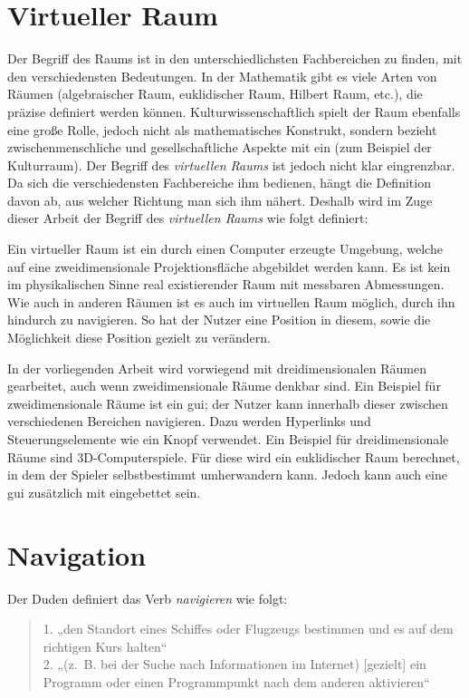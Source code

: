 \section{Virtueller Raum}
Der Begriff des Raums ist in den unterschiedlichsten Fachbereichen zu finden, mit den verschiedensten Bedeutungen.
In der Mathematik gibt es viele Arten von Räumen (algebraischer Raum, euklidischer Raum, Hilbert Raum, etc.), die präzise definiert werden können.
Kulturwissenschaftlich spielt der Raum ebenfalls eine große Rolle, jedoch nicht als mathematisches Konstrukt, sondern bezieht zwischenmenschliche und gesellschaftliche Aspekte mit ein (zum Beispiel der Kulturraum).
Der Begriff des \textit{virtuellen Raums} ist jedoch nicht klar eingrenzbar.
Da sich die verschiedensten Fachbereiche ihm bedienen, hängt die Definition davon ab, aus welcher Richtung man sich ihm nähert.
Deshalb wird im Zuge dieser Arbeit der Begriff des \textit{virtuellen Raums} wie folgt definiert:

Ein virtueller Raum ist ein durch einen Computer erzeugte Umgebung, welche auf eine zweidimensionale Projektionsfläche abgebildet werden kann.
Es ist kein im physikalischen Sinne real existierender Raum mit messbaren Abmessungen.
Wie auch in anderen Räumen ist es auch im virtuellen Raum möglich, durch ihn hindurch zu navigieren.
So hat der Nutzer eine Position in diesem, sowie die Möglichkeit diese Position gezielt zu verändern.

In der vorliegenden Arbeit wird vorwiegend mit dreidimensionalen Räumen gearbeitet, auch wenn zweidimensionale Räume denkbar sind.
Ein Beispiel für zweidimensionale Räume ist ein \ac{gui}; der Nutzer kann innerhalb dieser zwischen verschiedenen Bereichen navigieren.
Dazu werden Hyperlinks und Steuerungselemente wie ein Knopf verwendet.
Ein Beispiel für dreidimensionale Räume sind 3D-Computerspiele.
Für diese wird ein euklidischer Raum berechnet, in dem der Spieler selbstbestimmt umherwandern kann.
Jedoch kann auch eine \ac{gui} zusätzlich mit eingebettet sein.

\section{Navigation}
Der Duden definiert das Verb \textit{navigieren} wie folgt:

\begin{quote}
    1. „den Standort eines Schiffes oder Flugzeugs bestimmen und es auf dem richtigen Kurs halten“\\
    2. „(z. B. bei der Suche nach Informationen im Internet) [gezielt] ein Programm oder einen Programmpunkt nach dem anderen aktivieren“
    \cite{DudenNavigierenRechtschreibung}
\end{quote}

